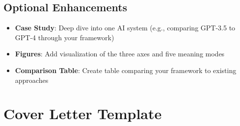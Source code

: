 \documentclass[12pt]{article}
\begin{document}
\subsection{Optional Enhancements}

\begin{itemize}[leftmargin=*]
\item \textbf{Case Study}: Deep dive into one AI system (e.g., comparing GPT-3.5 to GPT-4 through your framework)
\item \textbf{Figures}: Add visualization of the three axes and five meaning modes
\item \textbf{Comparison Table}: Create table comparing your framework to existing approaches
\end{itemize}

\section{Cover Letter Template}
\end{document}
